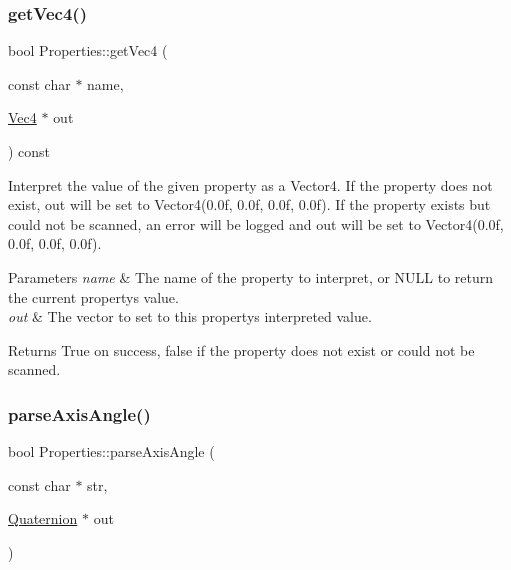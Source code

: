 \subsubsection{\texorpdfstring{get\+Vec4()}{getVec4()}\hspace{0.1cm}{\footnotesize\ttfamily [2/2]}}
{\footnotesize\ttfamily bool Properties\+::get\+Vec4 (\begin{DoxyParamCaption}\item[{const char $\ast$}]{name,  }\item[{\hyperlink{classVec4}{Vec4} $\ast$}]{out }\end{DoxyParamCaption}) const}

Interpret the value of the given property as a Vector4. If the property does not exist, out will be set to Vector4(0.\+0f, 0.\+0f, 0.\+0f, 0.\+0f). If the property exists but could not be scanned, an error will be logged and out will be set to Vector4(0.\+0f, 0.\+0f, 0.\+0f, 0.\+0f).


\begin{DoxyParams}{Parameters}
{\em name} & The name of the property to interpret, or N\+U\+LL to return the current property\textquotesingle{}s value. \\
\hline
{\em out} & The vector to set to this property\textquotesingle{}s interpreted value.\\
\hline
\end{DoxyParams}
\begin{DoxyReturn}{Returns}
True on success, false if the property does not exist or could not be scanned. 
\end{DoxyReturn}
\mbox{\label{classProperties_afd79153b542873012bc0cfc633937c68}} 
\subsubsection{\texorpdfstring{parse\+Axis\+Angle()}{parseAxisAngle()}\hspace{0.1cm}{\footnotesize\ttfamily [1/2]}}
{\footnotesize\ttfamily bool Properties\+::parse\+Axis\+Angle (\begin{DoxyParamCaption}\item[{const char $\ast$}]{str,  }\item[{\hyperlink{classQuaternion}{Quaternion} $\ast$}]{out }\end{DoxyParamCaption})\hspace{0.3cm}{\ttfamily [static]}}

